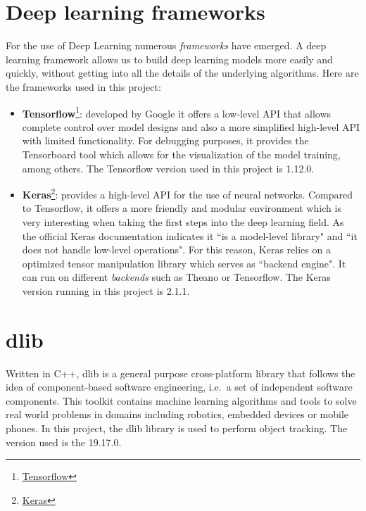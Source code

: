 \section{Deep learning frameworks}
For the use of Deep Learning numerous \textit{frameworks} have emerged. A deep learning framework allows us to build deep learning models more easily and quickly, without getting into all the details of the underlying algorithms. Here are the frameworks used in this project:
\begin{itemize}
\item \textbf{Tensorflow}\footnote {\href{https://www.tensorflow.org/}{Tensorflow}}: developed by Google it offers a low-level API that allows complete control over model designs and also a more simplified high-level API with limited functionality. For debugging purposes, it provides the Tensorboard tool which allows for the visualization of the model training, among others. The Tensorflow version used in this project is 1.12.0.
\item \textbf{Keras}\footnote {\href{https://keras.io/}{Keras}}: provides a high-level API for the use of neural networks. Compared to Tensorflow, it offers a more friendly and modular environment which is very interesting when taking the first steps into the deep learning field. As the official Keras documentation indicates it ``is a model-level library" and ``it does not handle low-level operations". For this reason, Keras relies on a optimized tensor manipulation library which serves as ``backend engine". It can run on different \textit{backends} such as Theano or Tensorflow. The Keras version running in this project is 2.1.1.
\end{itemize}

\section{dlib}
Written in C++, dlib is a general purpose cross-platform library that follows the idea of component-based software engineering, i.e.\ a set of independent software components. This toolkit contains machine learning algorithms and tools to solve real world problems in domains including robotics, embedded devices or mobile phones. In this project, the dlib library is used to perform object tracking. The version used is the 19.17.0.
